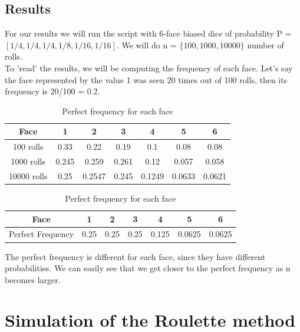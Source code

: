\documentclass[a4paper]{article}
\begin{document}
\subsection*{Results}
For our results we will run the script with 6-face biased dice of probability P = $[ 1/4, 1/4, 1/4, 1/8, 1/16, 1/16]$. We will do n = $\{ 100, 1000, 10000\}$ number of rolls.\\
To 'read' the results, we will be computing the frequency of each face. Let's say the face represented by the value 1 was seen 20 times out of 100 rolls, then its frequency is 20/100 = 0.2.

\begin{table}[H]
\begin{center}
\begin{tabular}{|c|c|c|c|c|c|c|}
\hline
Face        & 1      & 2      & 3      & 4      & 5      & 6      \\ \hline
100 rolls   & 0.33   & 0.22   & 0.19    & 0.1   & 0.08   & 0.08   \\ \hline
1000 rolls  & 0.245  & 0.259  & 0.261  & 0.12  & 0.057  & 0.058  \\ \hline
10000 rolls & 0.25 & 0.2547 & 0.245 & 0.1249 & 0.0633 & 0.0621 \\ \hline
\end{tabular}
\caption*{\label{BD} Frequency of each face for different number of rolls}
\vspace{0.6cm}
\begin{tabular}{|c|c|c|c|c|c|c|}
\hline
Face              & 1    & 2    & 3    & 4     & 5      & 6      \\ \hline
Perfect Frequency & 0.25 & 0.25 & 0.25 & 0.125 & 0.0625 & 0.0625 \\ \hline
\end{tabular}
\caption*{\label{BD} Perfect frequency for each face}
\end{center}
\end{table}
The perfect frequency is different for each face, since they have different probabilities. We can easily see that we get closer to the perfect frequency as n becomes larger.\\

\newpage
\section*{Simulation of the Roulette method}
\end{document}
